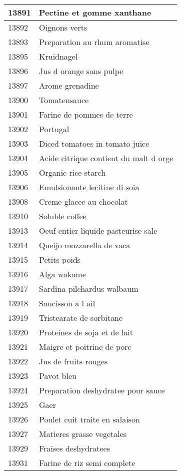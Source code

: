 \begin{longtable}{|l|l|}
13891 & Pectine et gomme xanthane \\ \hline 
13892 & Oignons verts \\ \hline 
13893 & Preparation au rhum aromatise \\ \hline 
13895 & Kruidnagel \\ \hline 
13896 & Jus d orange sans pulpe \\ \hline 
13897 & Arome grenadine \\ \hline 
13900 & Tomatensauce \\ \hline 
13901 & Farine de pommes de terre \\ \hline 
13902 & Portugal \\ \hline 
13903 & Diced tomatoes in tomato juice \\ \hline 
13904 & Acide citrique contient du malt d orge \\ \hline 
13905 & Organic rice starch \\ \hline 
13906 & Emulsionante lecitine di soia \\ \hline 
13908 & Creme glacee au chocolat \\ \hline 
13910 & Soluble coffee \\ \hline 
13913 & Oeuf entier liquide pasteurise sale \\ \hline 
13914 & Queijo mozzarella de vaca \\ \hline 
13915 & Petits poids \\ \hline 
13916 & Alga wakame \\ \hline 
13917 & Sardina pilchardus walbaum \\ \hline 
13918 & Saucisson a l ail \\ \hline 
13919 & Tristearate de sorbitane \\ \hline 
13920 & Proteines de soja et de lait \\ \hline 
13921 & Maigre et poitrine de porc \\ \hline 
13922 & Jus de fruits rouges \\ \hline 
13923 & Pavot bleu \\ \hline 
13924 & Preparation deshydratee pour sauce \\ \hline 
13925 & Gaer \\ \hline 
13926 & Poulet cuit traite en salaison \\ \hline 
13927 & Matieres grasse vegetales \\ \hline 
13929 & Fraises deshydratees \\ \hline 
13931 & Farine de riz semi complete \\ \hline 

\end{longtable}
